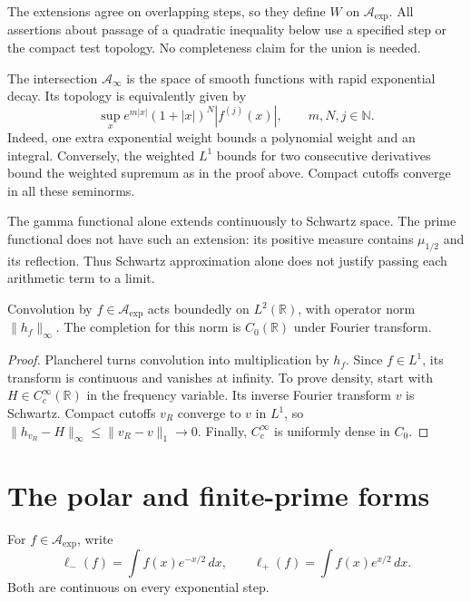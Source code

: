 The extensions agree on overlapping steps, so they define \(W\) on
\(\mathscr A_{\exp}\). All assertions about passage of a quadratic
inequality below use a specified step or the compact test topology.
No completeness claim for the union is needed.

The intersection \(\mathscr A_\infty\) is the space of smooth functions
with rapid exponential decay. Its topology is equivalently given by
\begin{equation}
 \sup_x e^{m|x|}(1+|x|)^N|f^{(j)}(x)|,
       \qquad m,N,j\in\mathbb N.
 \label{v4-arith:weil:eq:rapid-exponential}
\end{equation}
Indeed, one extra exponential weight bounds a polynomial weight and
an integral. Conversely, the weighted \(L^1\) bounds for two consecutive
derivatives bound the weighted supremum as in the proof above.
Compact cutoffs converge in all these seminorms.

The gamma functional alone extends continuously to Schwartz space.
The prime functional does not have such an extension: its positive
measure contains \(\mu_{1/2}\) and its reflection.
Thus Schwartz approximation alone does not justify passing each
arithmetic term to a limit.

\begin{proposition}
\label{v4-arith:weil:prop:regular}
Convolution by \(f\in\mathscr A_{\exp}\) acts boundedly on
\(L^2(\mathbb R)\), with operator norm \(\|h_f\|_\infty\).
The completion for this norm is \(C_0(\mathbb R)\) under Fourier
transform.
\end{proposition}
\begin{proof}
Plancherel turns convolution into multiplication by \(h_f\).
Since \(f\in L^1\), its transform is continuous and vanishes at infinity.
To prove density, start with \(H\in C_c^\infty(\mathbb R)\) in the
frequency variable. Its inverse Fourier transform \(v\) is Schwartz.
Compact cutoffs \(v_R\) converge to \(v\) in \(L^1\), so
\(\|h_{v_R}-H\|_\infty\le\|v_R-v\|_1\to0\).
Finally, \(C_c^\infty\) is uniformly dense in \(C_0\).
\end{proof}

\section{The polar and finite-prime forms}
\label{v4-arith:weil:signed-pieces}

For \(f\in\mathscr A_{\exp}\), write
\[
 \ell_-(f)=\int f(x)e^{-x/2}\,dx,\qquad
 \ell_+(f)=\int f(x)e^{x/2}\,dx.
\]
Both are continuous on every exponential step.


